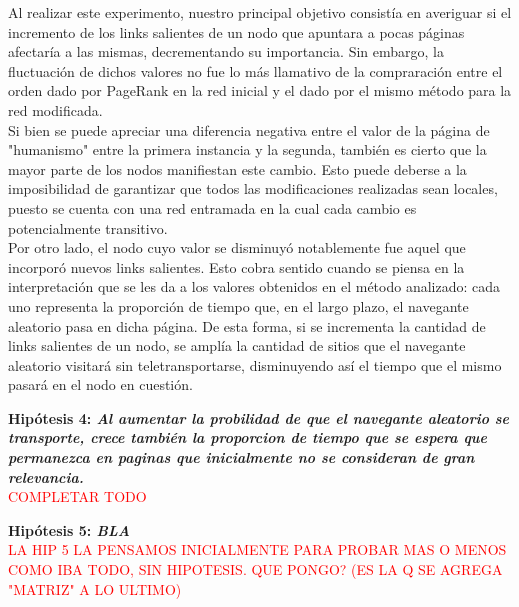 \documentclass[a4paper]{article}
\begin{document}
Al realizar este experimento, nuestro principal objetivo consistía en averiguar si el incremento de los links salientes de un nodo que apuntara a pocas páginas afectaría a las mismas, decrementando su importancia. Sin embargo, la fluctuación de dichos valores no fue lo más llamativo de la compraración entre el orden dado por PageRank en la red inicial y el dado por el mismo método para la red modificada. \\
Si bien se puede apreciar una diferencia negativa entre el valor de la página de "humanismo" entre la primera instancia y la segunda, también es cierto que la mayor parte de los nodos manifiestan este cambio. Esto puede deberse a la imposibilidad de garantizar que todos las modificaciones realizadas sean locales, puesto se cuenta con una red entramada en la cual cada cambio es potencialmente transitivo. \\
Por otro lado, el nodo cuyo valor se disminuyó notablemente fue aquel que incorporó nuevos links salientes. Esto cobra sentido cuando se piensa en la interpretación que se les da a los valores obtenidos en el método analizado: cada uno representa la proporción de tiempo que, en el largo plazo, el navegante aleatorio pasa en dicha página. De esta forma, si se incrementa la cantidad de links salientes de un nodo, se amplía la cantidad de sitios que el navegante aleatorio visitará sin teletransportarse, disminuyendo así el tiempo que el mismo pasará en el nodo en cuestión.


\newpage


\textbf{Hipótesis 4: \itshape{Al aumentar la probilidad de que el navegante aleatorio se transporte, crece también la proporcion de tiempo que se espera que permanezca en paginas que inicialmente no se consideran de gran relevancia.
 }}\\
\textcolor{red}{COMPLETAR TODO}\\

\newpage

\textbf{Hipótesis 5: \itshape{BLA }}\\
\textcolor{red}{LA HIP 5 LA PENSAMOS INICIALMENTE PARA PROBAR MAS O MENOS COMO IBA TODO, SIN HIPOTESIS. QUE PONGO? (ES LA Q SE AGREGA "MATRIZ" A LO ULTIMO)}\\

\newpage
\end{document}
